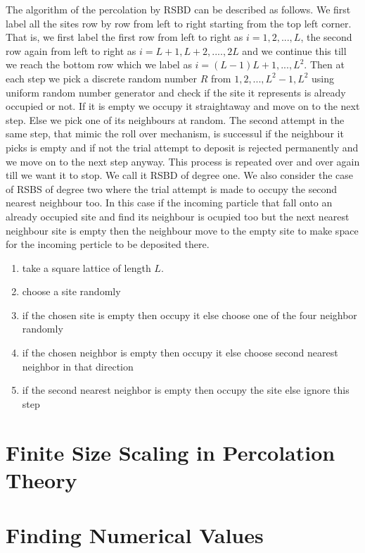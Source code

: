 The algorithm of the percolation by RSBD can be described as follows. We first label all the sites
row by row from left to right starting from the top left corner. That is, we first label the first row from
left to right as $i=1,2,...,L$, the second row again from left to right as $i=L+1,L+2,....,2L$
and we continue this till we reach the bottom row which we label as $i=(L-1)L+1,...,L^2$. 
Then at each step we pick a discrete random number $R$ from $1,2,...,L^2-1,L^2$ using uniform random number
generator and check if the site it represents is already occupied or not. If it is
empty we occupy it straightaway and move on to the next step. Else we pick one of its neighbours at random. 
The second attempt in the same step, that mimic the roll over mechanism, is successul if the neighbour
it picks is empty and if not the trial attempt to deposit is rejected permanently and we move on to the next 
step anyway. This process is
repeated over and over again till we want it to stop. We call it RSBD of degree one. We also consider
the case of RSBS of degree two where the trial attempt is made to occupy the second nearest neighbour too.
In this case if the incoming particle that fall onto an already occupied site and find its 
neighbour is ocupied too but the next nearest neighbour site is empty then the neighbour move to the empty
site to make space for the incoming perticle to be deposited there. 
\begin{enumerate}
	\item take a square lattice of length $L$.
	\item choose a site randomly
	\item if the chosen site is empty then occupy it else choose one of the four neighbor randomly
	\item if the chosen neighbor is empty then occupy it else choose second nearest neighbor in that direction
	\item if the second nearest neighbor is empty then occupy the site else ignore this step
\end{enumerate}
\section{Finite Size Scaling in Percolation Theory}
\section{Finding Numerical Values} 
\label{sect:finding-numerical-values}
